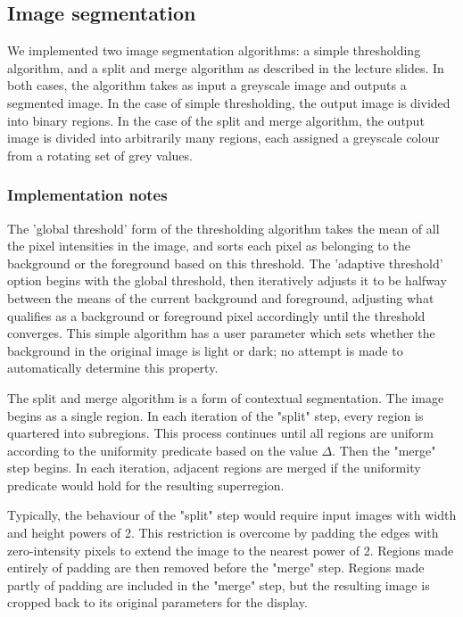 \subsection{Image segmentation}
\label{sec:segmentation}

We implemented two image segmentation algorithms: a simple thresholding algorithm, and a split and merge algorithm as described in the lecture slides. In both cases, the algorithm takes as input a greyscale image and outputs a segmented image. In the case of simple thresholding, the output image is divided into binary regions. In the case of the split and merge algorithm, the output image is divided into arbitrarily many regions, each assigned a greyscale colour from a rotating set of grey values.

\subsubsection{Implementation notes}

The 'global threshold' form of the thresholding algorithm takes the mean of all the pixel intensities in the image, and sorts each pixel as belonging to the background or the foreground based on this threshold. The 'adaptive threshold' option begins with the global threshold, then iteratively adjusts it to be halfway between the means of the current background and foreground, adjusting what qualifies as a background or foreground pixel accordingly until the threshold converges. This simple algorithm has a user parameter which sets whether the background in the original image is light or dark; no attempt is made to automatically determine this property.

The split and merge algorithm is a form of contextual segmentation. The image begins as a single region. In each iteration of the "split" step, every region is quartered into subregions. This process continues until all regions are uniform according to the uniformity predicate based on the value $\Delta$. Then the "merge" step begins. In each iteration, adjacent regions are merged if the uniformity predicate would hold for the resulting superregion.

Typically, the behaviour of the "split" step would require input images with width and height powers of 2. This restriction is overcome by padding the edges with zero-intensity pixels to extend the image to the nearest power of 2. Regions made entirely of padding are then removed before the "merge" step. Regions made partly of padding are included in the "merge" step, but the resulting image is cropped back to its original parameters for the display.

